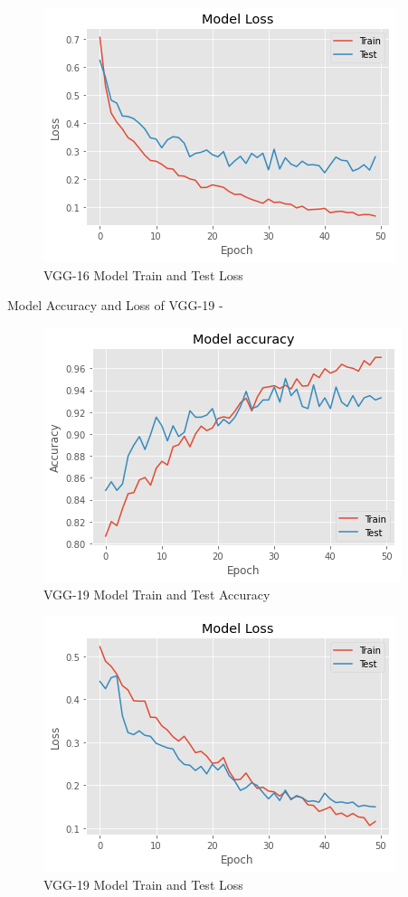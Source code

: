 \vspace{5mm}
\begin{figure}[hbt!]
\centering
\includegraphics[scale=1]{images/fig-26.png}
\caption{VGG-16 Model Train and Test Loss}
\label{fig:x VGG-16 Model Train and Test Loss}
\end{figure}

\newpage
\noindent Model Accuracy and Loss of VGG-19 -

\vspace{5mm}
\begin{figure}[hbt!]
\centering
\includegraphics[scale=1]{images/fig-27.png}
\caption{VGG-19 Model Train and Test Accuracy}
\label{fig:x VGG-19 Model Train and Test Accuracy}
\end{figure}

\vspace{5mm}
\begin{figure}[hbt!]
\centering
\includegraphics[scale=1]{images/fig-28.png}
\caption{VGG-19 Model Train and Test Loss}
\label{fig:x VGG-19 Model Train and Test Loss}
\end{figure}

